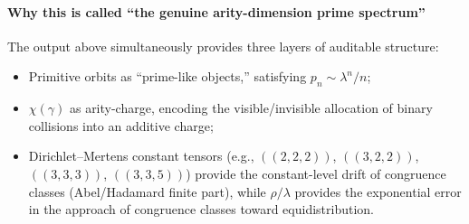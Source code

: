 \paragraph{Why this is called ``the genuine arity-dimension prime spectrum''}
The output above simultaneously provides three layers of auditable structure:
\begin{itemize}
  \item Primitive orbits as ``prime-like objects,'' satisfying $p_n\sim \lambda^n/n$;
\item $\chi(\gamma)$ as arity-charge, encoding the visible/invisible allocation of binary collisions into an additive charge;
  \item Dirichlet--Mertens constant tensors (e.g., \(((2,2,2))\), \(((3,2,2))\), \(((3,3,3))\), \(((3,3,5))\)) provide the constant-level drift of congruence classes (Abel/Hadamard finite part), while $\rho/\lambda$ provides the exponential error in the approach of congruence classes toward equidistribution.
\end{itemize}
